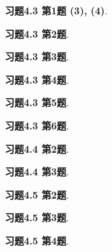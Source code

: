 \renewcommand{\newpageorvspace}{\vspace{2em}}

\date{第十一次作业}



\maketitle

{\bf 习题4.3 第1题 (3), (4)}.

\newpageorvspace

{\bf 习题4.3 第2题}.

\newpageorvspace

{\bf 习题4.3 第3题}.

\newpageorvspace

{\bf 习题4.3 第4题}.

\newpageorvspace

{\bf 习题4.3 第5题}.

\newpageorvspace

{\bf 习题4.3 第6题}.

\newpageorvspace

{\bf 习题4.4 第2题}.

\newpageorvspace

{\bf 习题4.4 第3题}.

\newpageorvspace

{\bf 习题4.5 第2题}.

\newpageorvspace

{\bf 习题4.5 第3题}.

\newpageorvspace

{\bf 习题4.5 第4题}.

